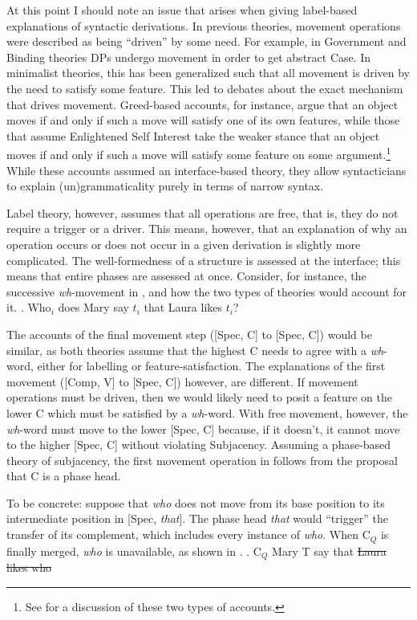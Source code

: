 \documentclass[MilwayThesis]{subfiles}
\begin{document}
At this point I should note an issue that arises when giving label-based explanations of syntactic derivations.
In previous theories, movement operations were described as being ``driven'' by some need.
For example, in Government and Binding theories DPs undergo movement in order to get abstract Case.
In minimalist theories, this has been generalized such that all movement is driven by the need to satisfy some feature.
This led to debates about the exact mechanism that drives movement. 
Greed-based accounts, for instance, argue that an object moves if and only if such a move will satisfy one of its own features, while those that assume Enlightened Self Interest take the weaker stance that an object moves if and only if such a move will satisfy some feature on some argument.\footnote{
	See \textcite{lasnik1999last} for a discussion of these two types of accounts.
}
While these accounts assumed an interface-based theory, they allow syntacticians to explain (un)grammaticality purely in terms of narrow syntax.

Label theory, however, assumes that all operations are free, that is, they do not require a trigger or a driver.
This means, however, that an explanation of why an operation occurs or does not occur in a given derivation is slightly more complicated.
The well-formedness of a structure is assessed at the interface; this means that entire phases are assessed at once.
Consider, for instance, the successive \textit{wh}-movement in \Next, and how the two types of theories would account for it.
\ex. Who$_i$ does Mary say $t_i$ that Laura likes $t_i$?

The accounts of the final movement step ([Spec, C] to [Spec, C]) would be similar, as both theories assume that the highest C needs to agree with a \textit{wh}-word, either for labelling or feature-satisfaction.
The explanations of the first movement ([Comp, V] to [Spec, C]) however, are different.
If movement operations must be driven, then we would likely need to posit a feature on the lower C which must be satisfied by a \textit{wh}-word.
With free movement, however, the \textit{wh}-word must move to the lower [Spec, C] because, if it doesn't, it cannot move to the higher [Spec, C] without violating Subjacency.
Assuming a phase-based theory of subjacency, the first movement operation in \Last follows from the proposal that C is a phase head.

To be concrete: suppose that \textit{who} does not move from its base position to its intermediate position in [Spec, \textit{that}].
The phase head \textit{that} would ``trigger'' the transfer of its complement, which includes every instance of \textit{who}.
When C$_{Q}$ is finally merged, \textit{who} is unavailable, as shown in \Next. 
\ex. C$_{Q}$ Mary T say that \sout{Laura likes who}
\end{document}

